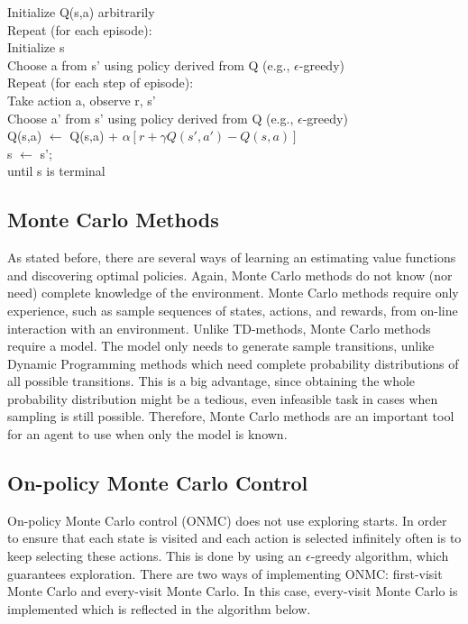 \documentclass{article}
\newcommand{\tab}{\hspace{10mm}}
\newcommand{\dtab}{\hspace{20mm}}
\begin{document}
\begin{center}
\begin{mdframed}
\begin{algorithm}[H]
Initialize Q(s,a) arbitrarily\\
Repeat (for each episode):\\
\tab Initialize s \\
\tab Choose a from s' using policy derived from Q (e.g., $\epsilon$-greedy)\\
\tab Repeat (for each step of episode):\\
\dtab Take action a, observe r, s'\\
\dtab Choose a' from s' using policy derived from Q (e.g., $\epsilon$-greedy)\\
\dtab Q(s,a) $\leftarrow$ Q(s,a) + $\alpha [ r + \gamma Q(s', a') - Q(s, a) ]$ \\
\dtab s $\leftarrow$ s'; \\
\tab until s is terminal\\
\end{algorithm}
\end{mdframed}
\label{alg:sarsa}
\end{center}



\subsection{Monte Carlo Methods}
As stated before, there are several ways of learning an estimating value functions and discovering optimal policies. Again, Monte Carlo methods do not know (nor need) complete knowledge of the environment. Monte Carlo methods require only experience, such as sample sequences of states, actions, and rewards, from on-line interaction with an environment. Unlike TD-methods, Monte Carlo methods require a model. The model only needs to generate sample transitions, unlike Dynamic Programming methods which need complete probability distributions of all possible transitions. This is a big advantage, since obtaining the whole probability distribution might be a tedious, even infeasible task in cases when sampling is still possible. Therefore, Monte Carlo methods are an important tool for an agent to use when only the model is known.

\subsection{On-policy Monte Carlo Control}
On-policy Monte Carlo control (ONMC) does not use exploring starts. In order to ensure that each state is visited and each action is selected infinitely often is to keep selecting these actions. This is done by using an $\epsilon$-greedy algorithm, which guarantees exploration. There are two ways of implementing ONMC: first-visit Monte Carlo and every-visit Monte Carlo. In this case, every-visit Monte Carlo is implemented which is reflected in the algorithm below. 
\end{document}
